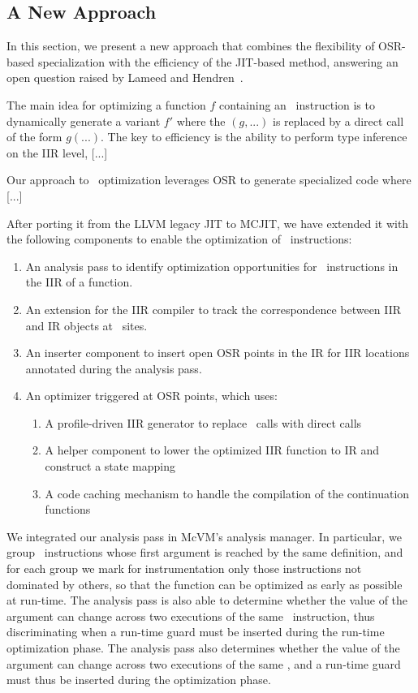
\subsection{A New Approach}
\label{ss:eval-opt-mcvm}

In this section, we present a new approach that combines the flexibility of OSR-based specialization with the efficiency of the JIT-based method, answering an open question raised by Lameed and Hendren~\cite{lameed2013feval}.

The main idea for optimizing a function $f$ containing an \feval\ instruction is to dynamically generate a variant $f'$ where the \feval$(g,...)$ is replaced by a direct call of the form $g(...)$. The key to efficiency is the ability to perform type inference on the IIR level, [...]

Our approach to \feval\ optimization leverages OSR to generate specialized code where [...]


After porting it from the LLVM legacy JIT to MCJIT, we have extended it with the following components to enable the optimization of \feval\ instructions:

\begin{enumerate}
\item An analysis pass to identify optimization opportunities for \feval\ instructions in the IIR of a function.
\item An extension for the IIR compiler to track the correspondence between IIR and IR objects at \feval\ sites.
\item An inserter component to insert open OSR points in the IR for IIR locations annotated during the analysis pass.
\item An optimizer triggered at OSR points, which uses:
\begin{enumerate}
\item A profile-driven IIR generator to replace \feval\ calls with direct calls
\item A helper component to lower the optimized IIR function to IR and construct a state mapping 
\item A code caching mechanism to handle the compilation of the continuation functions
\end{enumerate}
\end{enumerate}

We integrated our analysis pass in McVM's analysis manager. In particular, we group \feval\ instructions whose first argument is reached by the same definition, and for each group we mark for instrumentation only those instructions not dominated by others, so that the function can be optimized as early as possible at run-time. 
\ifdefined \fullver
The analysis pass is also able to determine whether the value of the argument can change across two executions of the same \feval\ instruction, thus discriminating when a run-time guard must be inserted during the run-time optimization phase.
\else
The analysis pass also determines whether the value of the argument can change across two executions of the same \feval, and a run-time guard must thus be inserted during the optimization phase.
\fi

